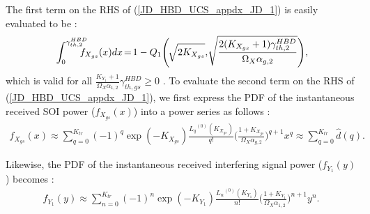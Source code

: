 The first term on the RHS of (\ref{JD_HBD_UCS_appdx_JD_1}) is easily evaluated to be \cite[Table I]{rached2017unified}:
\begin{eqnarray}
\int_{0}^{\gamma_{th,2}^{HBD}} \hspace{-0.35cm} f_{X_{gs}}(x) dx \hspace{-0.05cm} = \hspace{-0.05cm} 1 - Q_1\Bigg( \hspace{-0.05cm} \sqrt{2K_{X_{gs}}}, \hspace{-0.05cm} \sqrt{\frac{2(K_{X_{gs}}+1)\gamma_{th,2}^{HBD}}{\Omega_{X}\alpha_{g,2}}} \Bigg), \hspace{-0.1cm} \label{JD_HBD_UCS_appdx_JD_2}
\end{eqnarray}
which is valid for all $\frac{K_{Y_1}+1}{\Omega_{X}\alpha_{1,2}}\gamma_{th,gs}^{HBD}\geq0$ \cite{andras2011generalized}. To evaluate the second term on the RHS of (\ref{JD_HBD_UCS_appdx_JD_1}), we first express the PDF of the instantaneous received SOI power ($f_{X_{gs}}(x)$) into a power series as follows \cite[eq. (5)]{andras2011generalized}:
\begin{eqnarray}
f_{X_{gs}}(x) \approx \sum_{q=0}^{K_{tr}} (-1)^q \exp(-K_{X_{gs}}) \frac{{L_q}^{(0)}(K_{X_{gs}})}{q!} \bigg(\frac{1+K_{X_{gs}}}{\Omega_X\alpha_{g,2}}\bigg)^{q+1} x^q \approx \sum_{q=0}^{K_{tr}} \widehat{d}(q). \label{JD_HBD_UCS_appdx_JD_3}
\end{eqnarray}

Likewise, the PDF of the instantaneous received interfering signal power ($f_{Y_1}(y)$) becomes \cite[eq. (5)]{andras2011generalized}:
\begin{eqnarray}
f_{Y_{1}}(y) \approx \sum_{n=0}^{K_{tr}} (-1)^n \exp(-K_{Y_{1}}) \frac{{L_n}^{(0)}(K_{Y_{1}})}{n!} \bigg(\frac{1+K_{Y_{1}}}{\Omega_X\alpha_{1,2}}\bigg)^{n+1} y^n. \label{JD_HBD_UCS_appdx_JD_4}
\end{eqnarray}

